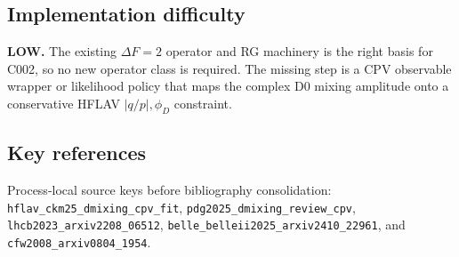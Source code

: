 \subsection*{Implementation difficulty}
\textbf{LOW.}  The existing \(\Delta F=2\) operator and RG machinery is the
right basis for C002, so no new operator class is required.  The missing step is
a CPV observable wrapper or likelihood policy that maps the complex D0 mixing
amplitude onto a conservative HFLAV \(|q/p|,\phi_D\) constraint.

\subsection*{Key references}
Process-local source keys before bibliography consolidation:
\texttt{hflav\_ckm25\_dmixing\_cpv\_fit},
\texttt{pdg2025\_dmixing\_review\_cpv},
\texttt{lhcb2023\_arxiv2208\_06512},
\texttt{belle\_belleii2025\_arxiv2410\_22961}, and
\texttt{cfw2008\_arxiv0804\_1954}.
